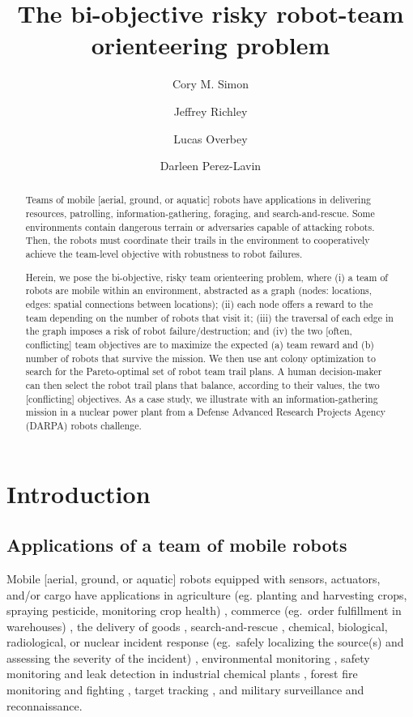\documentclass[11pt, oneside]{article}
\title{The bi-objective risky robot-team orienteering problem}
\author[1]{Cory M. Simon}
\author[2]{Jeffrey Richley}
\author[2]{Lucas Overbey}
\author[2]{Darleen Perez-Lavin}
\affil[1]{School of Chemical, Biological, and Environmental Engineering. Oregon State University. Corvallis, OR. USA.}
\affil[2]{Naval Information Warfare Center Atlantic. Charleston, SC. USA.}
\begin{document}
\maketitle

\begin{abstract}
Teams of mobile [aerial, ground, or aquatic] robots have applications in delivering resources, patrolling, information-gathering, foraging, and search-and-rescue.
Some environments contain dangerous terrain or adversaries capable of attacking robots. 
Then, the robots must coordinate their trails in the environment to cooperatively achieve the team-level objective with robustness to robot failures. 

Herein, we pose the bi-objective, risky team orienteering problem, where (i) a team of robots are mobile within an environment, abstracted as a graph (nodes: locations, edges: spatial connections between locations); (ii) each node offers a reward to the team depending on the number of robots that visit it; (iii) the traversal of each edge in the graph imposes a risk of robot failure/destruction; and (iv) the two [often, conflicting] team objectives are to maximize the expected (a) team reward and (b) number of robots that survive the mission. 
We then use ant colony optimization to search for the Pareto-optimal set of robot team trail plans. 
A human decision-maker can then select the robot trail plans that balance, according to their values, the two [conflicting] objectives. As a case study, we illustrate with an information-gathering mission in a nuclear power plant from a Defense Advanced Research Projects Agency (DARPA) robots challenge.
\end{abstract}

\clearpage


\section{Introduction}
\subsection{Applications of a team of mobile robots}
Mobile [aerial, ground, or aquatic] robots equipped with sensors, actuators, and/or cargo have applications in agriculture (eg. planting and harvesting crops, spraying pesticide, monitoring crop health) \cite{santos2020path}, commerce (eg.\ order fulfillment in warehouses) \cite{wurman2008coordinating}, the delivery of goods \cite{coelho2014thirty}, search-and-rescue \cite{queralta2020collaborative}, chemical, biological, radiological, or nuclear incident response (eg.\ safely localizing the source(s) and assessing the severity of the incident) \cite{murphy2012projected}, environmental monitoring \cite{dunbabin2012robots,hernandez2012mobile}, safety monitoring and leak detection in industrial chemical plants \cite{soldan2014towards,francis2022gas}, forest fire monitoring and fighting \cite{merino2012unmanned}, target tracking \cite{robin2016multi}, and military surveillance and reconnaissance. 
\end{document}
